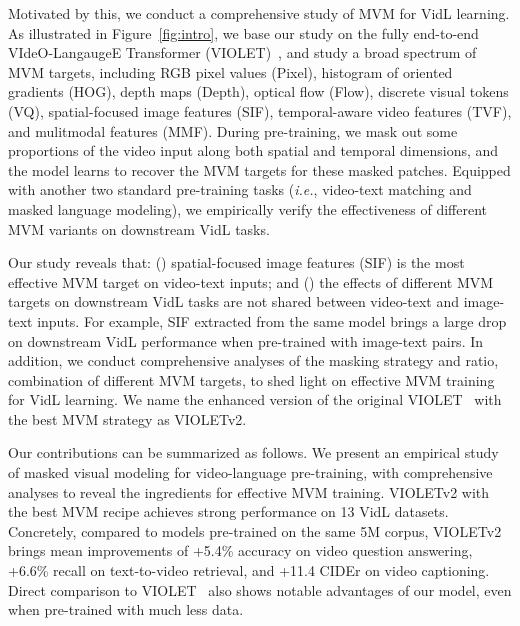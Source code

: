 \documentclass[10pt,twocolumn,letterpaper]{article}
\newcommand{\modelname}{VIOLETv2\xspace}
\newcommand{\modelorig}{VIOLET\xspace}
\begin{document}
Motivated by this, we conduct a comprehensive study of MVM for VidL learning. As illustrated in Figure~\ref{fig:intro}, we base our study on the fully end-to-end VIdeO-LangaugeE Transformer (\modelorig)~\cite{fu2021violet}, and study a broad spectrum of MVM targets, including RGB pixel values (Pixel), histogram of oriented gradients (HOG), depth maps (Depth), optical flow (Flow), discrete visual tokens (VQ), spatial-focused image features (SIF), temporal-aware video features (TVF), and mulitmodal features (MMF). During pre-training, we mask out some proportions of the video input along both spatial and temporal dimensions, and the model learns to recover the MVM targets for these masked patches. Equipped with another two standard pre-training tasks (\emph{i.e.}, video-text matching  and masked language modeling), we empirically verify the effectiveness of different MVM variants on downstream VidL tasks.  

Our study reveals that: () spatial-focused image features (SIF) is the most  effective MVM target on video-text inputs; and () the effects of different MVM targets on downstream VidL tasks are not shared between video-text and image-text inputs. For example, SIF extracted from the same model brings a large drop on downstream VidL performance when pre-trained with image-text pairs. In addition, we conduct comprehensive analyses of the masking strategy and ratio, combination of different MVM targets, to shed light on effective MVM training for VidL learning. We name the enhanced version of the original \modelorig~\cite{fu2021violet} with the best MVM strategy as \modelname.








Our contributions can be summarized as follows. We present an empirical study of masked visual modeling for video-language pre-training, with comprehensive analyses to reveal the ingredients for effective MVM training. \modelname with the best MVM recipe achieves strong performance on 13 VidL datasets.
Concretely, compared to models pre-trained on the same 5M corpus, \modelname brings mean improvements of +5.4\% accuracy on video question answering, +6.6\% recall on text-to-video retrieval, and +11.4 CIDEr on video captioning. Direct comparison to VIOLET~\cite{fu2021violet} also shows notable advantages of our model, even when pre-trained with much less data. 
\end{document}
